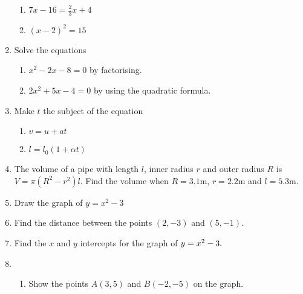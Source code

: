 \begin{enumerate}
	
	\begin{enumerate}
		\item $7 x -16 =\frac{2}{3} x +4$ 
		
		\item $\left (x -2\right )^{2} =15$ \end{enumerate}

	\item Solve the equations 
	
	
	\begin{enumerate}
		\item $x^{2} -2 x -8 =0$ by factorising. 
		
		\item $2 x^{2} +5 x -4 =0$ by using the quadratic formula. \end{enumerate}
	
	
	\item
	Make $t$ the subject of the equation 
	
	
	\begin{enumerate}
		\item $v =u +a t$ 
		
		\item $l =l_{0} \left (1 +\alpha  t\right )$ \end{enumerate}
	
	
	\item 
	The volume of a pipe with length $l$, inner radius $r$ and outer radius $R$ is $V =\pi  \left (R^{2} -r^{2}\right ) l\text{.}$ Find the volume when $R =3.1 \mbox{m}$, $r =2.2 \mbox{m}$ and $l =5.3 \mbox{m}\text{.}$ 
	
	\item  Draw the graph of $y =x^{2} -3$ 
	
	\item  Find the distance between the points $\left (2 , -3\right )$ and $\left (5 , -1\right )\text{.}$ 
	
	\item  Find the $x$ and $y$ intercepts for the graph of $y =x^{2} -3.\vspace{+5.000000cm}$ 
	
	\item    
	\setlength\fboxrule{0in}\setlength\fboxsep{0.2in}
	\begin{enumerate}
		\item Show the points $A \left (3 ,5\right )$ and $B \left ( -2 , -5\right )$ on the graph. 
		

\end{enumerate}
\end{enumerate}
